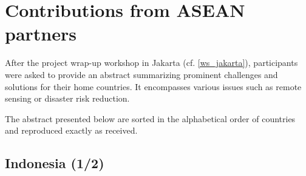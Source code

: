 \chapter{Contributions from ASEAN partners} \label{abstracts}

\tab After the project wrap-up workshop in Jakarta (cf. \ref{ws_jakarta}), participants were asked to provide an abstract summarizing prominent challenges and solutions for their home countries. It encompasses various issues such as remote sensing or disaster risk reduction.

\vspace{0.4 cm}

The abstract presented below are sorted in the alphabetical order of countries and reproduced exactly as received.

\section{Indonesia (1/2)}

\vspace{0.5 cm}

